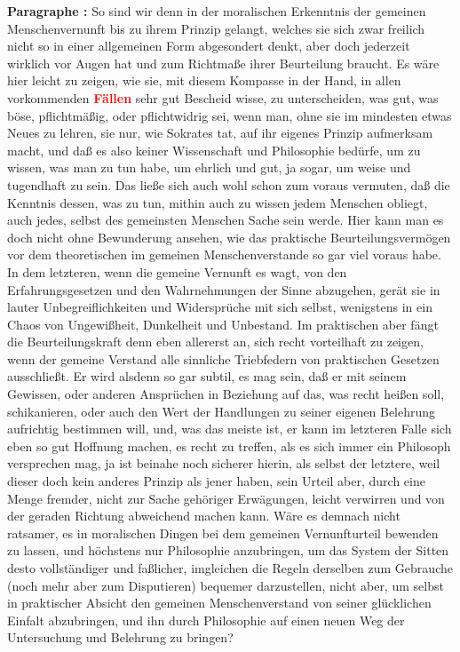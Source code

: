 \documentclass[a4paper,12pt,twoside]{book}
\newcommand{\match}[1]{\textcolor{red}{\textbf{#1}}}
\begin{document}
	\noindent\textbf{Paragraphe : }So sind wir denn in der moralischen Erkenntnis der gemeinen Menschenvernunft bis zu ihrem Prinzip gelangt, welches sie sich zwar freilich nicht so in einer allgemeinen  Form abgesondert denkt, aber doch jederzeit wirklich vor Augen hat und zum Richtmaße ihrer Beurteilung braucht. Es wäre hier leicht zu zeigen, wie sie, mit diesem Kompasse in der Hand, in allen vorkommenden \match{Fällen} sehr gut Bescheid wisse, zu unterscheiden, was gut, was böse, pflichtmäßig, oder pflichtwidrig sei, wenn man, ohne sie im mindesten etwas Neues zu lehren, sie nur, wie Sokrates tat, auf ihr eigenes Prinzip aufmerksam macht, und daß es also keiner Wissenschaft und Philosophie bedürfe, um zu wissen, was man zu tun habe, um ehrlich und gut, ja sogar, um weise und tugendhaft zu sein. Das ließe sich auch wohl schon zum voraus vermuten, daß die Kenntnis dessen, was zu tun, mithin auch zu wissen jedem Menschen obliegt, auch jedes, selbst des gemeinsten Menschen Sache sein werde. Hier kann man es doch nicht ohne Bewunderung ansehen, wie das praktische Beurteilungsvermögen vor dem theoretischen im gemeinen Menschenverstande so gar viel voraus habe. In dem letzteren, wenn die gemeine Vernunft es wagt, von den Erfahrungsgesetzen und den Wahrnehmungen der Sinne abzugehen, gerät sie in lauter Unbegreiflichkeiten und Widersprüche mit sich selbst, wenigstens in ein Chaos von Ungewißheit, Dunkelheit und Unbestand. Im praktischen aber fängt die Beurteilungskraft denn eben allererst an, sich recht vorteilhaft zu zeigen, wenn der gemeine Verstand alle sinnliche Triebfedern von praktischen Gesetzen ausschließt. Er wird alsdenn so gar subtil, es mag sein, daß er mit seinem Gewissen, oder anderen Ansprüchen in Beziehung auf das, was recht heißen soll, schikanieren, oder auch den Wert der Handlungen zu seiner eigenen Belehrung aufrichtig bestimmen will, und, was das meiste ist, er kann im letzteren Falle sich eben so gut Hoffnung machen, es recht zu treffen, als es sich immer ein Philosoph versprechen mag, ja ist beinahe noch sicherer hierin, als selbst der letztere, weil dieser doch kein anderes Prinzip als jener haben, sein Urteil aber, durch eine Menge fremder, nicht zur Sache gehöriger Erwägungen, leicht verwirren und von der geraden Richtung abweichend machen kann. Wäre es demnach nicht ratsamer,  es in moralischen Dingen bei dem gemeinen Vernunfturteil bewenden zu lassen, und höchstens nur Philosophie anzubringen, um das System der Sitten desto vollständiger und faßlicher, imgleichen die Regeln derselben zum Gebrauche (noch mehr aber zum Disputieren) bequemer darzustellen, nicht aber, um selbst in praktischer Absicht den gemeinen Menschenverstand von seiner glücklichen Einfalt abzubringen, und ihn durch Philosophie auf einen neuen Weg der Untersuchung und Belehrung zu bringen? 
	
\end{document}
